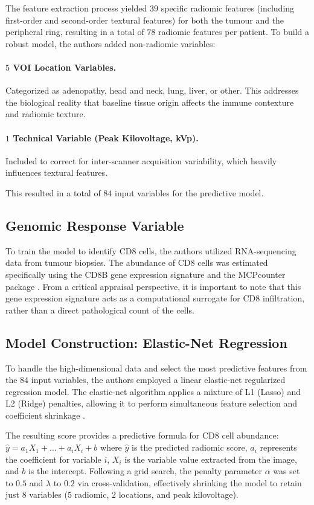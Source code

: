 \documentclass[10pt]{article}
\begin{document}
The feature extraction process yielded $39$ specific radiomic features (including first-order and second-order textural features) for both the tumour and the peripheral ring, resulting in a total of $78$ radiomic features per patient. To build a robust model, the authors added non-radiomic variables:
\paragraph{$5$ VOI Location Variables.} Categorized as adenopathy, head and neck, lung, liver, or other. This addresses the biological reality that baseline tissue origin affects the immune contexture and radiomic texture.

\paragraph{$1$ Technical Variable (Peak Kilovoltage, kVp).} Included to correct for inter-scanner acquisition variability, which heavily influences textural features.

This resulted in a total of $84$ input variables for the predictive model.

\subsection{Genomic Response Variable}
To train the model to identify CD8 cells, the authors utilized RNA-sequencing data from tumour biopsies. The abundance of CD8 cells was estimated specifically using the CD8B gene expression signature and the MCPcounter package \cite{becht2016}. From a critical appraisal perspective, it is important to note that this gene expression signature acts as a computational surrogate for CD8 infiltration, rather than a direct pathological count of the cells.

\subsection{Model Construction: Elastic-Net Regression}
To handle the high-dimensional data and select the most predictive features from the $84$ input variables, the authors employed a linear elastic-net regularized regression model. The elastic-net algorithm applies a mixture of L1 (Lasso) and L2 (Ridge) penalties, allowing it to perform simultaneous feature selection and coefficient shrinkage \cite{zou2005}.

The resulting score provides a predictive formula for CD8 cell abundance: $\hat{y} = a_1 X_1 + \ldots + a_{i} X_i + b$ where $\hat{y}$ is the predicted radiomic score, $a_i$ represents the coefficient for variable $i$, $X_i$ is the variable value extracted from the image, and $b$ is the intercept. Following a grid search, the penalty parameter $\alpha$ was set to $0.5$ and $\lambda$ to $0.2$ via cross-validation, effectively shrinking the model to retain just $8$ variables ($5$ radiomic, $2$ locations, and peak kilovoltage).
\end{document}
